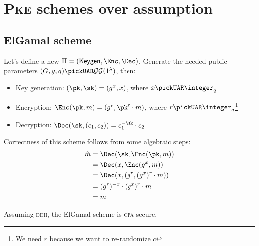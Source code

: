 
\section{\textsc{Pke} schemes over \ddh{} assumption}

\subsection{ElGamal scheme}

Let's define a new $\Pi = (\keygen, \Enc, \Dec)$. Generate the needed public parameters $(G,g,q) \pickUAR \groupgen(1^{\lambda})$\footnotemark, then:


\begin{itemize}
    \item Key generation: $(\pk, \sk) = (g^x, x)$, where $x \pickUAR \integer_q$
    \item Encryption: $\Enc(\pk, m) = (g^r, \pk^r \cdot m)$, where $r \pickUAR \integer_q$\footnote{We need $r$ because we want to re-randomize $c$}
    \item Decryption: $\Dec(\sk, (c_1, c_2))= c_1^{-\sk} \cdot c_2$
\end{itemize}

Correctness of this scheme follows from some algebraic steps:
\begin{align*}
    \hat{m} &= \Dec(\sk, \Enc(\pk, m))          \\
            &= \Dec(x, \Enc(g^x, m))            \\
            &= \Dec(x, (g^r, (g^x)^r \cdot m))  \\
            &= (g^r)^{-x} \cdot (g^x)^r \cdot m \\
            &= m                                \\
\end{align*}

\begin{theorem}
    Assuming \textsc{ddh}, the ElGamal scheme is \textsc{cpa}-secure.
\end{theorem}

